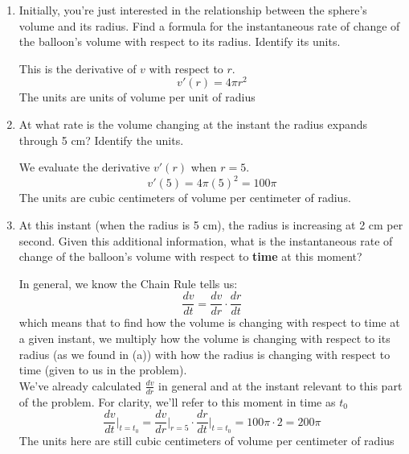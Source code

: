 \documentclass{article}
\begin{document}
\begin{enumerate}
    \begin{enumerate}
        \item 
        \begin{problem}[\vfill]Initially, you're just interested in the relationship between the sphere's volume and its radius. Find a formula for the instantaneous rate of change of the balloon's volume with respect to its radius. Identify its units.
        \end{problem}

        \begin{solution}
            This is the derivative of $v$ with respect to $r$.
            $$v'(r) = 4\pi r^2$$
            The units are units of volume per unit of radius
        \end{solution}
        \item 
        \begin{problem}[\vfill] At what rate is the volume changing at the instant the radius expands through 5 cm? Identify the units.
        \end{problem}
        \begin{solution}
            We evaluate the derivative $v'(r)$ when $r=5$.
            $$v'(5)=4\pi (5)^2=100\pi$$
            The units are cubic centimeters of volume per centimeter of radius.
        \end{solution}
        \item 
        \begin{problem}[\vfill]
            At this instant (when the radius is 5 cm), the radius is increasing at 2 cm per second. Given this additional information, what is the instantaneous rate of change of the balloon's volume with respect to {\bf time} at this moment?\\
        \end{problem}
        \begin{solution}
        In general, we know the Chain Rule tells us:
            $$\frac{dv}{dt} = \frac{dv}{dr}\cdot \frac{dr}{dt}$$
            which means that to find how the volume is changing with respect to time at a given instant, we multiply how the volume is changing with respect to its radius (as we found in (a)) with how the radius is changing with respect to time (given to us in the problem).\\
            We've already calculated $\frac{dv}{dr}$ in general and at the instant relevant to this part of the problem. For clarity, we'll refer to this moment in time as $t_0$
            $$\frac{dv}{dt}\bigg\vert_{t=t_0}=\frac{dv}{dr}\bigg\vert_{r=5}\cdot\frac{dr}{dt}\bigg\vert_{t=t_0} = 100\pi \cdot 2 = 200 \pi $$
            The units here are still cubic centimeters of volume per centimeter of radius
            

\end{solution}
\end{enumerate}
\end{enumerate}
\end{document}
